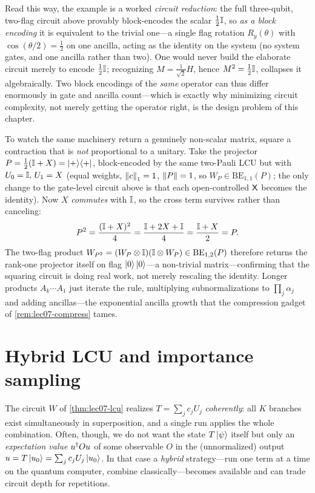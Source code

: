 \begin{example}
Read this way, the example is a worked \emph{circuit reduction}: the full three-qubit,
two-flag circuit above provably block-encodes the scalar $\tfrac12\mathbb{I}$, so \emph{as a
block encoding} it is equivalent to the trivial one---a single flag rotation
$R_y(\theta)$ with $\cos(\theta/2)=\tfrac12$ on one ancilla, acting as the identity on the
system (no system gates, and one ancilla rather than two). One would never build the
elaborate circuit merely to encode $\tfrac12\mathbb{I}$; recognizing $M=\tfrac1{\sqrt2}H$, hence
$M^2=\tfrac12\mathbb{I}$, collapses it algebraically. Two block encodings of the \emph{same}
operator can thus differ enormously in gate and ancilla count---which is exactly why
minimizing circuit complexity, not merely getting the operator right, is the design
problem of this chapter.

To watch the same machinery return a genuinely non-scalar matrix, square a contraction
that is \emph{not} proportional to a unitary. Take the projector
$P=\tfrac12(\mathbb{I}+X)=\ket{+}\!\bra{+}$, block-encoded by the same two-Pauli LCU but with
$U_0=\mathbb{I},\,U_1=X$ (equal weights, $\left\lVert c \right\rVert_1=1$, $\left\lVert P \right\rVert=1$, so
$W_P\in\mathrm{BE}_{1,1}(P)$; the only change to the gate-level circuit above is that each
open-controlled $\mathsf{X}$ becomes the identity). Now $X$ \emph{commutes} with $\mathbb{I}$, so the
cross term survives rather than canceling:
\[
  P^2=\frac{(\mathbb{I}+X)^2}{4}=\frac{\mathbb{I}+2X+\mathbb{I}}{4}=\frac{\mathbb{I}+X}{2}=P.
\]
The two-flag product $W_{P^2}=(W_P\otimes\mathbb{I})(\mathbb{I}\otimes W_P)\in\mathrm{BE}_{1,2}(P)$
therefore returns the rank-one projector itself on flag $\ket0\ket0$---a non-trivial
matrix---confirming that the squaring circuit is doing real work, not merely rescaling
the identity. Longer products $A_k\cdots A_1$ just iterate the
rule, multiplying subnormalizations to $\prod_j\alpha_j$ and adding ancillas---the
exponential ancilla growth that the compression gadget of
\cref{rem:lec07-compress} tames.
\end{example}

\section{Hybrid LCU and importance sampling}
\label{sec:lec07-4}

The circuit $W$ of \cref{thm:lec07-lcu} realizes $T=\sum_j c_j U_j$
\emph{coherently}: all $K$ branches exist simultaneously in superposition, and a
single run applies the whole combination. Often, though, we do not want the state
$T\ket{\psi}$ itself but only an \emph{expectation value}
$u^{\dagger} O u$ of some observable $O$ in the (unnormalized) output
$u=T\ket{u_0}=\sum_j c_j U_j\ket{u_0}$. In that case a \emph{hybrid} strategy---run
one term at a time on the quantum computer, combine classically---becomes available
and can trade circuit depth for repetitions.

